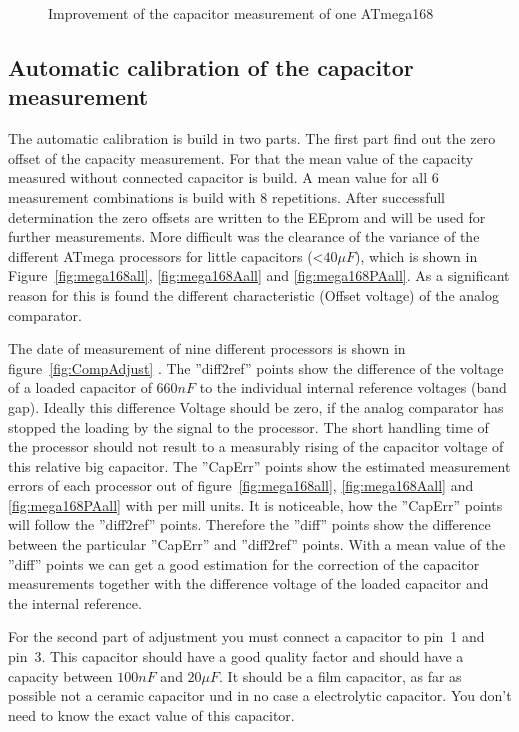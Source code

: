 \begin{figure}[H]
\centering

\caption{Improvement of the capacitor measurement of one ATmega168}
\label{fig:mega168optcap}
\end{figure}

\subsection{Automatic calibration of the capacitor measurement}

The automatic calibration is build in two parts. The first part find out the zero offset of the capacity measurement.
For that the mean value of the capacity measured without connected capacitor is build. 
A mean value for all 6 measurement combinations is build with 8 repetitions.
After successfull determination the zero offsets are written to the EEprom and will be used for further measurements.
More difficult was the clearance of the variance of the different ATmega processors for little capacitors (\textless \(40 \mu F\)),
which is shown in Figure~\ref{fig:mega168all}, \ref{fig:mega168Aall} and \ref{fig:mega168PAall}.
As a significant reason for this is found the different characteristic (Offset voltage) of the analog comparator.

The date of measurement of nine different processors is shown in figure~\ref{fig:CompAdjust} .
The ''diff2ref'' points show the difference of the voltage of a loaded capacitor of \(660 nF\) to the
individual internal reference voltages (band gap).
Ideally this difference Voltage should be zero, if the analog comparator has stopped the loading by the signal to
the processor. The short handling time of the processor should not result to a measurably rising of the 
capacitor voltage of this relative big capacitor.
The ''CapErr'' points show the estimated measurement errors of each processor out of figure~\ref{fig:mega168all}, \ref{fig:mega168Aall} 
and \ref{fig:mega168PAall} with per mill units.
It is noticeable, how the ''CapErr'' points will follow the ''diff2ref'' points.
Therefore the ''diff'' points show the difference between the particular ''CapErr'' and ''diff2ref'' points.
With a mean value of the ''diff'' points we can get a good estimation for the correction of the capacitor
measurements together with the difference voltage of the loaded capacitor and the internal reference.

For the second part of adjustment you must connect a capacitor to pin~1 and pin~3. This capacitor should have
a good quality factor and should have a capacity between \(100 nF\) and \(20 \mu F\).
It should be a film capacitor, as far as possible not a ceramic capacitor und in no case a electrolytic capacitor.
You don't need to know the exact value of this capacitor.

